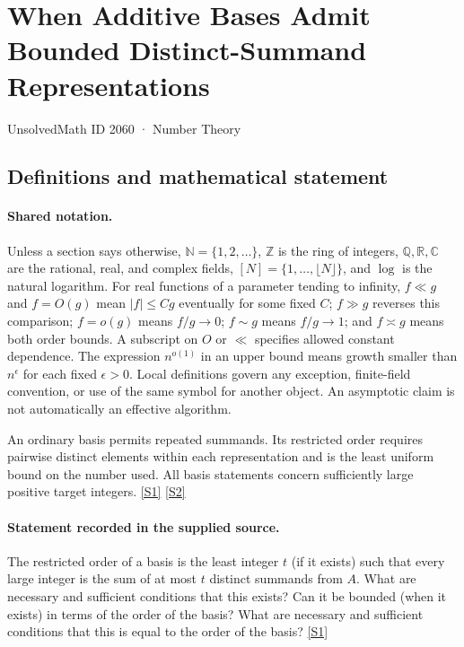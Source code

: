 \documentclass[11pt,a4paper]{article}
\newcommand{\N}{\mathbb{N}}
\newcommand{\Z}{\mathbb{Z}}
\newcommand{\Q}{\mathbb{Q}}
\newcommand{\R}{\mathbb{R}}
\newcommand{\C}{\mathbb{C}}
\newcommand{\sref}[2]{\hyperlink{source:#1:#2}{[S#2]}}
\begin{document}

\setcounter{section}{2059}

\section{When Additive Bases Admit Bounded Distinct-Summand Representations}\label{2060}

{\small\sffamily UnsolvedMath ID 2060 · Number Theory}

\subsection{Definitions and mathematical statement}

\paragraph{Shared notation.}Unless a section says otherwise, $\N=\{1,2,\ldots\}$,
$\Z$ is the ring of integers, $\Q,\R,\C$ are the rational, real, and complex
fields, $[N]=\{1,\ldots,\lfloor N\rfloor\}$, and $\log$ is the natural
logarithm. For real functions of a parameter tending to infinity,
$f\ll g$ and $f=O(g)$ mean $|f|\leq Cg$ eventually for some fixed $C$;
$f\gg g$ reverses this comparison; $f=o(g)$ means $f/g\to0$;
$f\sim g$ means $f/g\to1$; and $f\asymp g$ means both order bounds.
A subscript on $O$ or $\ll$ specifies allowed constant dependence.
The expression $n^{o(1)}$ in an upper bound means growth smaller than
$n^\epsilon$ for each fixed $\epsilon>0$. Local definitions govern any
exception, finite-field convention, or use of the same symbol for another
object. An asymptotic claim is not automatically an effective algorithm.



An ordinary basis permits repeated summands. Its restricted order requires pairwise distinct elements within each representation and is the least uniform bound on the number used. All basis statements concern sufficiently large positive target integers. \sref{2060}{1} \sref{2060}{2}

\paragraph{Statement recorded in the supplied source.}
The restricted order of a basis is the least integer $t$ (if it exists) such that every large integer is the sum of at most $t$ distinct summands from $A$. What are necessary and sufficient conditions that this exists? Can it be bounded (when it exists) in terms of the order of the basis? What are necessary and sufficient conditions that this is equal to the order of the basis? \sref{2060}{1}
\end{document}
